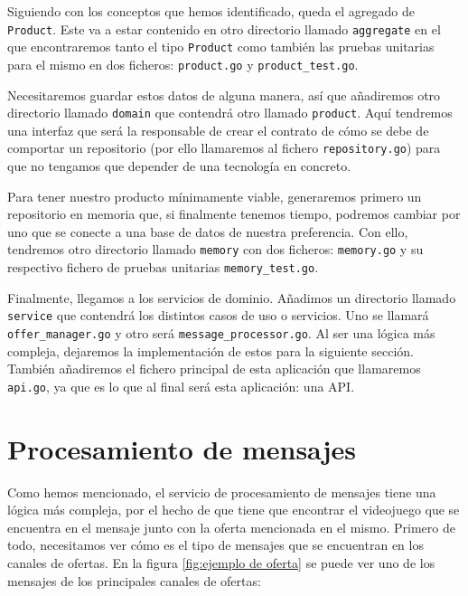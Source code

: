 Siguiendo con los conceptos que hemos identificado, queda el agregado de 
\verb|Product|. Este va a estar contenido en otro directorio llamado 
\verb|aggregate| en el que encontraremos tanto el tipo \verb|Product| como también 
las pruebas unitarias para el mismo en dos ficheros: \verb|product.go| y 
\verb|product_test.go|.

Necesitaremos guardar estos datos de alguna manera, así que añadiremos otro 
directorio llamado \verb|domain| que contendrá otro llamado \verb|product|. Aquí 
tendremos una interfaz que será la responsable de crear el contrato de cómo se debe 
de comportar un repositorio (por ello llamaremos al fichero \verb|repository.go|) 
para que no tengamos que depender de una tecnología en concreto. 

Para tener nuestro producto mínimamente viable, generaremos primero un repositorio 
en memoria que, si finalmente tenemos tiempo, podremos cambiar por uno que se 
conecte a una base de datos de nuestra preferencia. Con ello, tendremos otro  
directorio llamado \verb|memory| con dos ficheros: \verb|memory.go| y su respectivo 
fichero de pruebas unitarias \verb|memory_test.go|.

Finalmente, llegamos a los servicios de dominio. Añadimos un directorio llamado 
\verb|service| que contendrá los distintos casos de uso o servicios. Uno se llamará 
\verb|offer_manager.go| y otro será \verb|message_processor.go|. Al ser una lógica 
más compleja, dejaremos la implementación de estos para la siguiente sección. 
También añadiremos el fichero principal de esta aplicación que llamaremos 
\verb|api.go|, ya que es lo que al final será esta aplicación: una API.

\section{Procesamiento de mensajes}

Como hemos mencionado, el servicio de procesamiento de mensajes tiene una lógica 
más compleja, por el hecho de que tiene que encontrar el videojuego que se 
encuentra en el mensaje junto con la oferta mencionada en el mismo. Primero de 
todo, necesitamos ver cómo es el tipo de mensajes que se encuentran en los canales 
de ofertas. En la figura \ref{fig:ejemplo de oferta} se puede ver uno de los 
mensajes de los principales canales de ofertas:

